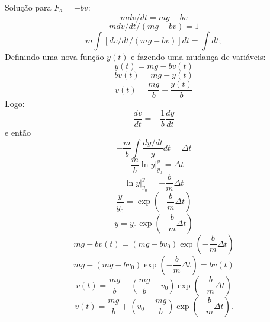 Solução para $F_a = -bv$:
\begin{equation}
    m dv/dt = mg - b v
\end{equation}
\begin{equation}
    m dv/dt / (mg -bv) = 1
\end{equation}
\begin{equation}
    m\int [dv/dt / (mg - bv)] dt = \int dt ;
\end{equation}
%
Definindo uma nova função $y(t)$ e fazendo uma mudança de variáveis:
\begin{equation}
    y(t) = mg - b v(t) 
\end{equation}
\begin{equation}
    b v(t) = mg - y(t)
\end{equation}
\begin{equation}
    v(t) = \frac{mg}{b} - \frac{y(t)}{b}
\end{equation}
%
Logo:
\begin{equation}
    \frac{dv}{dt} = -\frac{1}{b} \frac{dy}{dt}
\end{equation}
%
e então
\begin{equation}
    -\frac{m}{b} \int \frac{dy/dt}{y} dt = \Delta t
\end{equation}
\begin{equation}
    -\frac{m}{b} \ln y |_{y_0}^y = \Delta t
\end{equation}
\begin{equation}
    \ln y |_{y_0}^y = -\frac{b}{m} \Delta t
\end{equation}
\begin{equation}
    \frac{y}{y_0} = \exp\left(-\frac{b}{m} \Delta t\right)
\end{equation}
\begin{equation}
    y = y_0 \exp\left(-\frac{b}{m} \Delta t\right)
\end{equation}
\begin{equation}
    mg - b v(t) = (mg - b v_0) \exp\left(-\frac{b}{m} \Delta t\right)
\end{equation}
\begin{equation}
    mg - (mg - b v_0) \exp\left(-\frac{b}{m} \Delta t\right) = b v(t)
\end{equation}
\begin{equation}
    v(t) = \frac{mg}{b} - \left(\frac{mg}{b} - v_0\right) \exp\left(-\frac{b}{m} \Delta t\right)
\end{equation}
\begin{equation}
    v(t) = \frac{mg}{b} + \left(v_0 - \frac{mg}{b}\right) \exp \left(-\frac{b}{m} \Delta t\right).
\end{equation}

